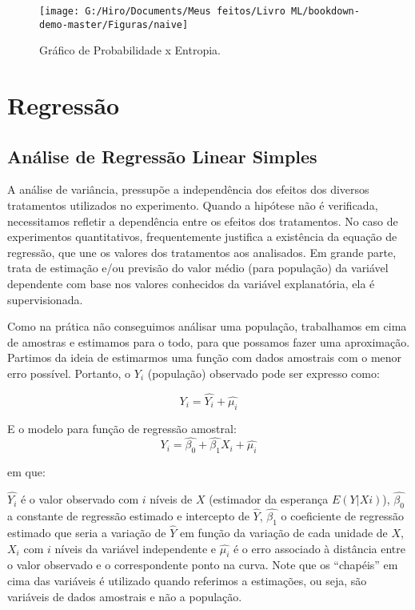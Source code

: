 \documentclass[
]{book}
\begin{document}
\begin{figure}

{\centering \texttt{[image: G:/Hiro/Documents/Meus feitos/Livro ML/bookdown-demo-master/Figuras/naive]} 

}

\caption{Gráfico de Probabilidade x Entropia.}\label{fig:naive}
\end{figure}



\hypertarget{reg}{%
\section{Regressão}\label{reg}}

\hypertarget{reglin}{%
\subsection{Análise de Regressão Linear Simples}\label{reglin}}

A análise de variância, pressupõe a independência dos efeitos dos diversos tratamentos utilizados no experimento. Quando a hipótese não é verificada, necessitamos refletir a dependência entre os efeitos dos tratamentos. No caso de experimentos quantitativos, frequentemente justifica a existência da equação de regressão, que une os valores dos tratamentos aos analisados. Em grande parte, trata de estimação e/ou previsão do valor médio (para população) da variável dependente com base nos valores conhecidos da variável explanatória, ela é supervisionada.

Como na prática não conseguimos análisar uma população, trabalhamos em cima de amostras e estimamos para o todo, para que possamos fazer uma aproximação. Partimos da ideia de estimarmos uma função com dados amostrais com o menor erro possível. Portanto, o \(Y_i\) (população) observado pode ser expresso como:

\begin{equation}
    Y_i=\hat{Y_i}+\hat{\mu_i}
    \label{eq:frp}
\end{equation}

E o modelo para função de regressão amostral:
\begin{equation}
    Y_i=\hat{\beta_0}+\hat{\beta_1}X_i+\hat{\mu_i}
    \label{eq:fra}
\end{equation}

em que:

\(\hat{Y_i}\) é o valor observado com \(i\) níveis de \(X\) (estimador da esperança \(E(Y|Xi)\)), \(\hat{\beta_0}\) a constante de regressão estimado e intercepto de \(\hat{Y}\), \(\hat{\beta_1}\) o coeficiente de regressão estimado que seria a variação de \(\hat{Y}\) em função da variação de cada unidade de \(X\), \(X_i\) com \(i\) níveis da variável independente e \(\hat{\mu_i}\) é o erro associado à distância entre o valor observado e o correspondente ponto na curva. Note que os ``chapéis'' em cima das variáveis é utilizado quando referimos a estimações, ou seja, são variáveis de dados amostrais e não a população.
\end{document}

